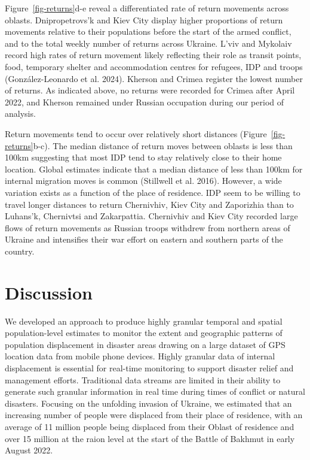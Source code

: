 \documentclass[
  sn-nature,
  11pt,
]{sn-jnl}
\begin{document}
Figure~\ref{fig-returns}d-e reveal a differentiated rate of return
movements across oblasts. Dnipropetrovs'k and Kiev City display higher
proportions of return movements relative to their populations before the
start of the armed conflict, and to the total weekly number of returns
across Ukraine. L'viv and Mykolaiv record high rates of return movement
likely reflecting their role as transit points, food, temporary shelter
and accommodation centres for refugees, IDP and troops
(González-Leonardo et al. 2024). Kherson and Crimea register the lowest
number of returns. As indicated above, no returns were recorded for
Crimea after April 2022, and Kherson remained under Russian occupation
during our period of analysis.

Return movements tend to occur over relatively short distances
(Figure~\ref{fig-returns}b-c). The median distance of return moves
between oblasts is less than 100km suggesting that most IDP tend to stay
relatively close to their home location. Global estimates indicate that
a median distance of less than 100km for internal migration moves is
common (Stillwell et al. 2016). However, a wide variation exists as a
function of the place of residence. IDP seem to be willing to travel
longer distances to return Chernivhiv, Kiev City and Zaporizhia than to
Luhans'k, Chernivtsi and Zakarpattia. Chernivhiv and Kiev City recorded
large flows of return movements as Russian troops withdrew from northern
areas of Ukraine and intensifies their war effort on eastern and
southern parts of the country.

\section{Discussion}\label{discussion}

We developed an approach to produce highly granular temporal and spatial
population-level estimates to monitor the extent and geographic patterns
of population displacement in disaster areas drawing on a large dataset
of GPS location data from mobile phone devices. Highly granular data of
internal displacement is essential for real-time monitoring to support
disaster relief and management efforts. Traditional data streams are
limited in their ability to generate such granular information in real
time during times of conflict or natural disasters. Focusing on the
unfolding invasion of Ukraine, we estimated that an increasing number of
people were displaced from their place of residence, with an average of
11 million people being displaced from their Oblast of residence and
over 15 million at the raion level at the start of the Battle of Bakhmut
in early August 2022.
\end{document}
